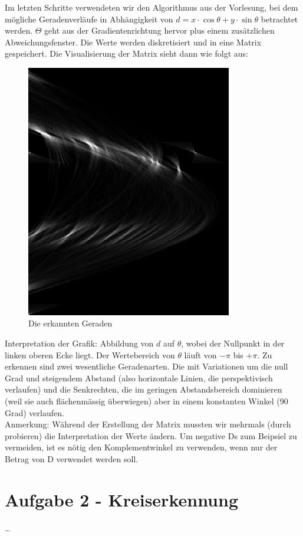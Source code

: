 Im letzten Schritte verwendeten wir den Algorithmus aus der Vorlesung, bei dem 
m\"ogliche Geradenverl\"aufe in Abh\"angigkeit von $d = x \cdot \cos \theta + y \cdot \sin \theta $
betrachtet werden. $\Theta$ geht aus der Gradientenrichtung hervor plus einem zus\"atzlichen
Abweichungsfenster. Die Werte werden diskretisiert und in eine Matrix gespeichert. Die Visualisierung
der Matrix sieht dann wie folgt aus:

\begin{figure} [H]
\begin{center}
\includegraphics[width=90mm]{u10/street_lines.eps}
\end{center}
\label{streetl}
\caption{Die erkannten Geraden}
\end{figure}

Interpretation der Grafik: Abbildung von $d$ auf $\theta$, wobei der Nullpunkt in der linken oberen
Ecke liegt. Der Wertebereich von $\theta$ l\"auft von $-\pi$ bis $+\pi$. Zu erkennen sind zwei 
wesentliche Geradenarten. Die mit Variationen um die null Grad und steigendem Abstand (also 
horizontale Linien, die perspektivisch verlaufen) und die Senkrechten, die im geringen Abstandsbereich
dominieren (weil sie auch fl\"achenm\"assig \"uberwiegen) aber in einem konstanten Winkel (90 Grad)
verlaufen.
\\
Anmerkung: W\"ahrend der Erstellung der Matrix mussten wir mehrmals (durch probieren) die
Interpretation der Werte \"andern. Um negative Ds zum Beipsiel zu vermeiden, ist es n\"otig
den Komplementwinkel zu verwenden, wenn nur der Betrag von D verwendet werden soll.

\section*{Aufgabe 2 - Kreiserkennung}
\ldots



